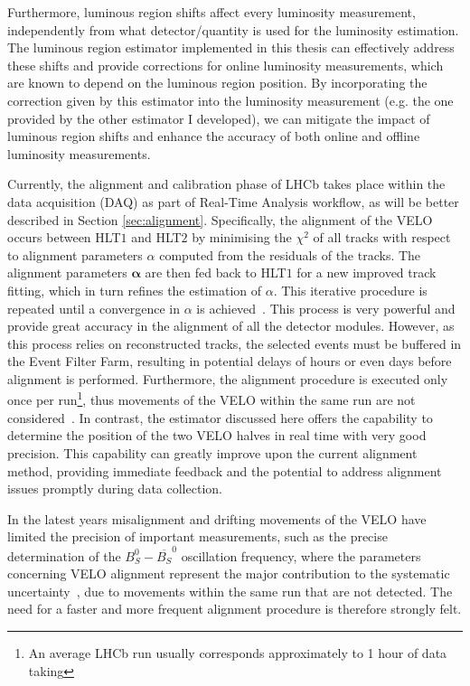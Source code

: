 Furthermore, luminous region shifts affect every luminosity measurement, independently from what detector/quantity is used for the luminosity estimation. The luminous region estimator implemented in this thesis can effectively address these shifts and provide corrections for online luminosity measurements, which are known to depend on the luminous region position. By incorporating the correction given by this estimator into the luminosity measurement  (e.g. the one provided by the other estimator I developed), we can mitigate the impact of luminous region shifts and enhance the accuracy of both online and offline luminosity measurements.

Currently, the alignment and calibration phase of LHCb takes place within the data acquisition (DAQ) as part of Real-Time Analysis workflow, as will be better described in Section \ref{sec:alignment}. Specifically, the alignment of the VELO occurs between HLT$1$ and HLT$2$ by minimising the $\chi^2$ of all tracks with respect to alignment parameters $\alpha$ computed from the residuals of the tracks. The alignment parameters $\mathbf{\alpha}$ are then fed back to HLT$1$ for a new improved track fitting, which in turn refines the estimation of $\alpha$. This iterative procedure is repeated until a convergence in $\alpha$ is achieved~\cite{FRUHWIRTH1987444, Frühwirth:803519}. This process is very powerful and provide great accuracy in the alignment of all the detector modules. However, as this process relies on reconstructed tracks, the selected events must be buffered in the Event Filter Farm, resulting in potential delays of hours or even days before alignment is performed. Furthermore, the alignment procedure is executed only once per run\footnote{An average LHCb run usually corresponds approximately to 1 hour of data taking}, thus movements of the VELO within the same run are not considered~\cite{Dziurda:2640712}. In contrast, the estimator discussed here offers the capability to determine the position of the two VELO halves in real time with very good precision. This capability can greatly improve upon the current alignment method, providing immediate feedback and the potential to address alignment issues promptly during data collection.

In the latest years misalignment and drifting movements of the VELO have limited the precision of important measurements, such as the precise determination of the $B_S^0-\overline{B_S} ^0$ oscillation frequency, where the parameters concerning VELO alignment represent the major contribution to the systematic uncertainty~\cite{b0b0soscillation}, due to movements within the same run that are not detected. The need for a faster and more frequent alignment procedure is therefore strongly felt.  
    



